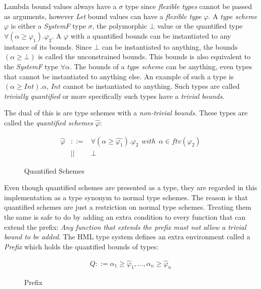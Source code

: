 Lambda bound values always have a $\sigma$ type since \emph{flexible types} cannot be passed as arguments, however \emph{Let} bound values can have a \emph{flexible type} $\varphi$.
A \emph{type scheme} $\varphi$ is either a \emph{SystemF} type $\sigma$, the polymorphic $\bot$ value or the quantified type $\forall (\alpha \geq \varphi_1). \varphi_2$. A $\varphi$ with a quantified bounds can be instantiated to any instance of its bounds. Since $\bot$ can be instantiated to anything, the bounds $(\alpha \geq \bot)$ is called the unconstrained bounds. This bounds is also equivalent to the \emph{SystemF} type $\forall \alpha$. The bounds of a \emph{type scheme} can be anything, even types that cannot be instantiated to anything else. An example of such a type is $(\alpha \geq Int).\alpha$, $Int$ cannot be instantiated to anything. Such types are called \emph{trivially quantified} or more specifically such types have a \emph{trivial bounds}.

The dual of this is are type schemes with a \emph{non-trivial bounds}. These types are called the \emph{quantified schemes} $\hat{\varphi}$:

\begin{figure}[H]
\begin{eqnarray*}
\hat{\varphi} & ::= & \forall (\alpha \geq \hat{\varphi_1}). \varphi_2 \hspace{5pt} with \hspace{5pt} \alpha \in ftv(\varphi_2) \\
              & || & \bot
\end{eqnarray*}
\caption{Quantified Schemes}
\label{quantified-schemes}
\end{figure}

Even though quantified schemes are presented as a type, they are regarded in this implementation as a type synonym to normal type schemes. The reason is that quantified schemes are just a restriction on normal type schemes. Treating them the same is safe to do by adding an extra condition to every function that can extend the prefix: \emph{Any function that extends the prefix must not allow a trivial bound to be added}.
The HML type system defines an extra environment called a \emph{Prefix} which holds the quantified bounds of types:

\begin{figure}[H]
\begin{eqnarray*}
Q ::= \alpha_1\geq\hat{\varphi}_1,\ldots,\alpha_n\geq\hat{\varphi}_n
\end{eqnarray*}
\caption{Prefix}
\label{Prefix}
\end{figure}

